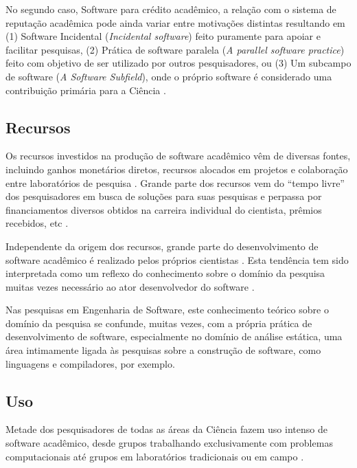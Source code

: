 No segundo caso, Software para crédito acadêmico, a relação com o sistema de
reputação acadêmica pode ainda variar entre motivações distintas resultando em
(1) Software Incidental ({\it Incidental software})
feito puramente para apoiar e facilitar pesquisas,
(2) Prática de software paralela ({\it A parallel software practice})
feito com objetivo de ser utilizado por outros pesquisadores, ou
(3) Um subcampo de software ({\it A Software Subfield}),
onde o próprio software é considerado uma contribuição primária para a Ciência
\cite{howison2011scientific}.

\subsection{Recursos}

Os recursos investidos na produção de software acadêmico vêm de diversas
fontes, incluindo ganhos monetários diretos, recursos alocados em projetos e
colaboração entre laboratórios de pesquisa \cite{howison2015understanding}.
Grande parte dos recursos vem do ``tempo livre'' dos pesquisadores em busca de
soluções para suas pesquisas e perpassa por financiamentos diversos obtidos na
carreira individual do cientista, prêmios recebidos, etc
\cite{howison2015understanding}.

Independente da origem dos recursos, grande parte do desenvolvimento de
software acadêmico é realizado pelos próprios cientistas \cite{hettrick2014uk,
momcheva2015software}.
Esta tendência tem sido interpretada como um reflexo do conhecimento sobre o
domínio da pesquisa muitas vezes necessário ao ator desenvolvedor do software
\cite{segal2008developing}.

Nas pesquisas em Engenharia de Software, este conhecimento teórico sobre o
domínio da pesquisa se confunde, muitas vezes, com a própria prática de
desenvolvimento de software, especialmente no domínio de análise estática, uma
área intimamente ligada às pesquisas sobre a construção de software,
como linguagens e compiladores, por exemplo.

\subsection{Uso}

Metade dos pesquisadores de todas as áreas da Ciência fazem uso intenso de
software acadêmico, desde grupos trabalhando exclusivamente com problemas
computacionais até grupos em laboratórios tradicionais ou em campo
\cite{wilson2014best}.


